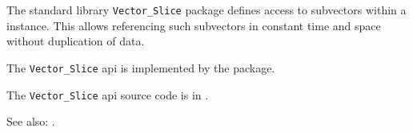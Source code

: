 
The standard library {\tt Vector\_Slice} package defines access to subvectors within a 
 instance.  This allows referencing such subvectors in 
constant time and space without duplication of data.

The {\tt Vector\_Slice} api is implemented by the  package.

The {\tt Vector\_Slice} api source code is in .


See also: .

